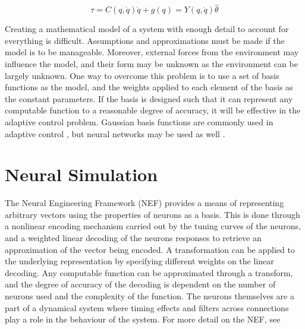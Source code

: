 \documentclass[letterpaper,12pt,titlepage,oneside,final]{book}
\begin{document}
\begin{equation} \label{eq:input_equation}
\tau = C(q,\dot{q})\dot{q} + g(q) = Y(q,\dot{q})\hat{\theta}
\end{equation}

Creating a mathematical model of a system with enough detail to account for everything is difficult. 
Assumptions and approximations must be made if the model is to be manageable. 
Moreover, external forces from the environment may influence the model, and their form may be unknown as the environment can be largely unknown. 
One way to overcome this problem is to use a set of basis functions as the model, and the weights applied to each element of the basis as the constant parameters. 
If the basis is designed such that it can represent any computable function to a reasonable degree of accuracy, it will be effective in the adaptive control problem. 
Gaussian basis functions are commonly used in adaptive control \cite{sanner1992gaussian}, but neural networks may be used as well \cite{barto1983neuronlike}.

\section{Neural Simulation}




The Neural Engineering Framework (NEF)\cite{eliasmith2004neural} provides a means of representing arbitrary vectors using the properties of neurons as a basis.
This is done through a nonlinear encoding mechanism carried out by the tuning curves of the neurons, and a weighted linear decoding of the neurons responses to retrieve an approximation of the vector being encoded.
A transformation can be applied to the underlying representation by specifying different weights on the linear decoding.
Any computable function can be approximated through a transform, and the degree of accuracy of the decoding is dependent on the number of neurons used and the complexity of the function.
The neurons themselves are a part of a dynamical system where timing effects and filters across connections play a role in the behaviour of the system. 
For more detail on the NEF, see \cite{eliasmith2007build, stewart2011neural, eliasmith2013build} %
\end{document}
